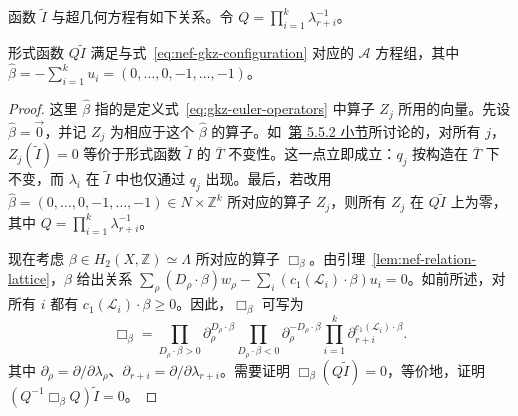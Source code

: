 函数 $\widetilde I$ 与超几何方程有如下关系。令
$Q=\prod_{i=1}^k\lambda_{r+i}^{-1}$。
\begin{proposition}\label{prop:nef-i-gkz}
形式函数 $Q\widetilde I$ 满足与式~\eqref{eq:nef-gkz-configuration} 对应的 $\mathcal A$ 方程组，其中
$\widehat\beta=-\sum_{i=1}^ku_i=(0,\ldots,0,-1,\ldots,-1)$。
\end{proposition}
\begin{proof}
这里 $\widehat\beta$ 指的是定义式~\eqref{eq:gkz-euler-operators} 中算子 $Z_j$ 所用的向量。先设 $\widehat\beta=\vec0$，并记 $Z_j$ 为相应于这个 $\widehat\beta$ 的算子。如~\hyperref[subsec:toric-gkz]{第 5.5.2 小节}所讨论的，对所有 $j$，$Z_j(\widetilde I)=0$ 等价于形式函数 $\widetilde I$ 的 $\overline T$ 不变性。这一点立即成立：$q_j$ 按构造在 $\overline T$ 下不变，而 $\lambda_i$ 在 $\widetilde I$ 中也仅通过 $q_j$ 出现。最后，若改用 $\widehat\beta=(0,\ldots,0,-1,\ldots,-1)\in N\times\mathbb Z^k$ 所对应的算子 $Z_j$，则所有 $Z_j$ 在 $Q\widetilde I$ 上为零，其中 $Q=\prod_{i=1}^k\lambda_{r+i}^{-1}$。

现在考虑 $\beta\in H_2(X,\mathbb Z)\simeq\Lambda$ 所对应的算子 $\Box_\beta$。由引理~\ref{lem:nef-relation-lattice}，$\beta$ 给出关系
$\sum_\rho(D_\rho\cdot\beta)w_\rho-\sum_i(c_1(\mathcal L_i)\cdot\beta)u_i=0$。如前所述，对所有 $i$ 都有 $c_1(\mathcal L_i)\cdot\beta\geq0$。因此，$\Box_\beta$ 可写为
\begin{equation}\label{eq:nef-gkz-box}
\Box_\beta=
\prod_{D_\rho\cdot\beta>0}\partial_\rho^{D_\rho\cdot\beta}
\prod_{D_\rho\cdot\beta<0}\partial_\rho^{-D_\rho\cdot\beta}
\prod_{i=1}^k\partial_{r+i}^{c_1(\mathcal L_i)\cdot\beta}.
\end{equation}
其中 $\partial_\rho=\partial/\partial\lambda_\rho$、$\partial_{r+i}=\partial/\partial\lambda_{r+i}$。需要证明 $\Box_\beta(Q\widetilde I)=0$，等价地，证明
$(Q^{-1}\Box_\beta Q)\widetilde I=0$。


\end{proof}
